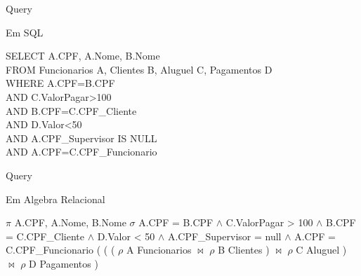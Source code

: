 \documentclass[aspectratio=169]{beamer}
\begin{document}
  \begin{frame}{Query}
   
    Em SQL
    
    \begin{flushleft}
      SELECT A.CPF, A.Nome, B.Nome \\
      FROM Funcionarios A, Clientes B, Aluguel C, Pagamentos D \\
      WHERE A.CPF=B.CPF \\
      AND C.ValorPagar>100 \\
      AND B.CPF=C.CPF\_Cliente \\
      AND D.Valor<50 \\
      AND A.CPF\_Supervisor IS NULL \\
      AND A.CPF=C.CPF\_Funcionario  \\
    \end{flushleft}

  \end{frame}
  \begin{frame}{Query}
  
    Em Algebra Relacional
    \begin{flushleft}
      $\pi$ A.CPF, A.Nome, B.Nome $\sigma$ A.CPF = B.CPF $\wedge$ C.ValorPagar > 100 $\wedge$ B.CPF = C.CPF\_Cliente $\wedge$ D.Valor < 50 $\wedge$ A.CPF\_Supervisor = null $\wedge$ A.CPF = C.CPF\_Funcionario ( ( ( $\rho$ A Funcionarios $\bowtie$ $\rho$ B Clientes ) $\bowtie$ $\rho$ C Aluguel ) $\bowtie$ $\rho$ D Pagamentos ) 
    \end{flushleft}
  \end{frame}
\end{document}
